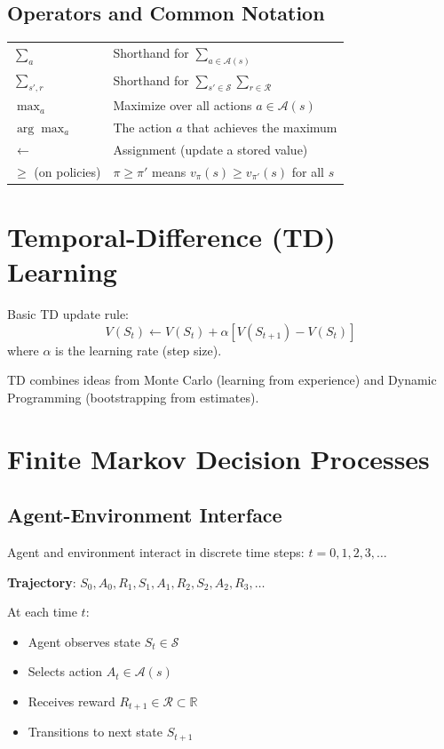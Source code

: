 \documentclass[10pt]{article}
\begin{document}
\subsection{Operators and Common Notation}

\begin{tabular}{@{}l l@{}}
$\sum_a$ & Shorthand for $\sum_{a \in \mathcal{A}(s)}$ \\
$\sum_{s', r}$ & Shorthand for $\sum_{s' \in \mathcal{S}} \sum_{r \in \mathcal{R}}$ \\
$\max_a$ & Maximize over all actions $a \in \mathcal{A}(s)$ \\
$\arg\max_a$ & The action $a$ that achieves the maximum \\
$\leftarrow$ & Assignment (update a stored value) \\
$\geq$ (on policies) & $\pi \geq \pi'$ means $v_\pi(s) \geq v_{\pi'}(s)$ for all $s$ \\
\end{tabular}

\section{Temporal-Difference (TD) Learning}
Basic TD update rule:
\begin{equation}
V(S_t) \leftarrow V(S_t) + \alpha\left[V(S_{t+1}) - V(S_t)\right]
\end{equation}
where $\alpha$ is the learning rate (step size).

TD combines ideas from Monte Carlo (learning from experience) and Dynamic Programming (bootstrapping from estimates).

\section{Finite Markov Decision Processes}

\subsection{Agent-Environment Interface}
Agent and environment interact in discrete time steps: $t = 0, 1, 2, 3, \ldots$

\textbf{Trajectory}: $S_0, A_0, R_1, S_1, A_1, R_2, S_2, A_2, R_3, \ldots$

At each time $t$:
\begin{itemize}
\item Agent observes state $S_t \in \mathcal{S}$
\item Selects action $A_t \in \mathcal{A}(s)$
\item Receives reward $R_{t+1} \in \mathcal{R} \subset \mathbb{R}$
\item Transitions to next state $S_{t+1}$
\end{itemize}
\end{document}
